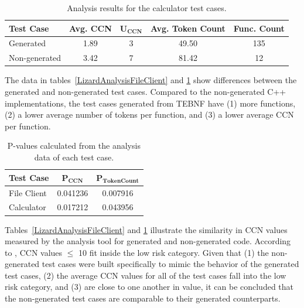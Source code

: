 \begin{table}[h]
\begin{center}
\caption{Analysis results for the calculator test cases.}
\label{LizardAnalysisCalculator}
\begin{tabular}{|l|c|c|c|c|} \hline
\textbf{Test Case} & \textbf{Avg. CCN} & $\mathbf{U_{CCN}}$ & \textbf{Avg. Token Count} & \textbf{Func. Count} \\ \hline \hline
Generated     & 1.89 & 3 & 49.50 & 135 \\ \hline
Non-generated & 3.42 & 7 & 81.42 & 12  \\ \hline
\end{tabular}
\end{center}
\end{table}

\indent
The data in tables~\ref{LizardAnalysisFileClient} and \ref{LizardAnalysisCalculator} show differences between the generated and non-generated test cases.  Compared to the non-generated C++ implementations, the test cases generated from TEBNF have (1) more functions, (2) a lower average number of tokens per function, and (3) a lower average CCN per function.

\begin{table}[h]
\begin{center}
\caption{P-values calculated from the analysis data of each test case.}
\label{LizardAnalysisPvalues}
\begin{tabular}{|l|c|c|} \hline
\textbf{Test Case} & $\mathbf{P_{CCN}}$ & $\mathbf{P_{TokenCount}}$ \\ \hline \hline
File Client & 0.041236 & 0.007916 \\ \hline
Calculator  & 0.017212 & 0.043956 \\ \hline
\end{tabular}
\end{center}
\end{table}

\indent
Tables~\ref{LizardAnalysisFileClient} and \ref{LizardAnalysisCalculator} illustrate the similarity in CCN values measured by the analysis tool for generated and non-generated code.  According to \cite{linuxJournal_01}, CCN values $\leq$ 10 fit inside the low risk category.  Given that (1) the non-generated test cases were built specifically to mimic the behavior of the generated test cases, (2) the average CCN values for all of the test cases fall into the low risk category, and (3) are close to one another in value, it can be concluded that the non-generated test cases are comparable to their generated counterparts.

